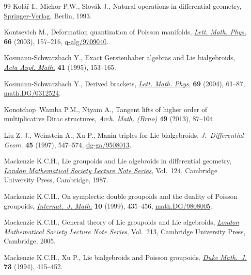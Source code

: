 \documentclass[10pt,a4paper]{amsart}
\numberwithin{equation}{section}
\begin{document}
\begin{thebibliography}{99}
Kol{\'a}{\v{r}} I., Michor P.W., Slov{\'a}k J., Natural operations in
  dif\/ferential geometry, \href{http://dx.doi.org/10.1007/978-3-662-02950-3}{Springer-Verlag}, Berlin, 1993.

Kontsevich M., Deformation quantization of {P}oisson manifolds, \href{http://dx.doi.org/10.1023/B:MATH.0000027508.00421.bf}{\textit{Lett.
  Math. Phys.}} \textbf{66} (2003), 157--216, \mbox{\href{http://arxiv.org/abs/q-alg/9709040}{q-alg/9709040}}.

Kosmann-Schwarzbach Y., Exact {G}erstenhaber algebras and {L}ie bialgebroids,
  \href{http://dx.doi.org/10.1007/BF00996111}{\textit{Acta Appl. Math.}} \textbf{41} (1995), 153--165.

Kosmann-Schwarzbach Y., Derived brackets, \href{http://dx.doi.org/10.1007/s11005-004-0608-8}{\textit{Lett. Math. Phys.}}
  \textbf{69} (2004), 61--87, \href{http://arxiv.org/abs/math.DG/0312524}{math.DG/0312524}.

Kouotchop~Wamba P.M., Ntyam A., Tangent lifts of higher order of multiplicative
  {D}irac structures, \href{http://dx.doi.org/10.5817/AM2013-2-87}{\textit{Arch. Math. (Brno)}} \textbf{49} (2013), 87--104.

Liu Z.-J., Weinstein A., Xu P., Manin triples for {L}ie bialgebroids,
  \textit{J.~Differential Geom.} \textbf{45} (1997), 547--574,
  \href{http://arxiv.org/abs/dg-ga/9508013}{dg-ga/9508013}.

Mackenzie K.C.H., Lie groupoids and {L}ie algebroids in dif\/ferential geometry,
  \href{http://dx.doi.org/10.1017/CBO9780511661839}{\textit{London Mathematical Society Lecture Note Series}}, Vol.~124, Cambridge
  University Press, Cambridge, 1987.

Mackenzie K.C.H., On symplectic double groupoids and the duality of {P}oisson
  groupoids, \href{http://dx.doi.org/10.1142/S0129167X99000185}{\textit{Internat.~J. Math.}} \textbf{10} (1999), 435--456,
  \href{http://arxiv.org/abs/math.DG/9808005}{math.DG/9808005}.

Mackenzie K.C.H., General theory of {L}ie groupoids and {L}ie algebroids,
  \href{http://dx.doi.org/10.1017/CBO9781107325883}{\textit{London Mathematical Society Lecture Note Series}}, Vol.~213, Cambridge
  University Press, Cambridge, 2005.

Mackenzie K.C.H., Xu P., Lie bialgebroids and {P}oisson groupoids, \href{http://dx.doi.org/10.1215/S0012-7094-94-07318-3}{\textit{Duke
  Math.~J.}} \textbf{73} (1994), 415--452.


\end{thebibliography}
\end{document}
